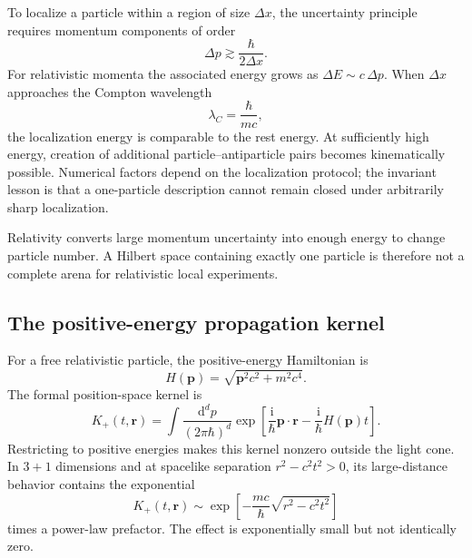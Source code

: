 \documentclass[11pt]{article}
\newcommand{\dd}{\mathrm{d}}
\newcommand{\ii}{\mathrm{i}}
\begin{document}
To localize a particle within a region of size $\Delta x$, the uncertainty
principle requires momentum components of order
\begin{equation}
  \Delta p\gtrsim\frac{\hbar}{2\Delta x}.
\end{equation}
For relativistic momenta the associated energy grows as
$\Delta E\sim c\,\Delta p$.  When $\Delta x$ approaches the Compton
wavelength
\begin{equation}
  \lambda_C=\frac{\hbar}{mc},
\end{equation}
the localization energy is comparable to the rest energy.  At sufficiently
high energy, creation of additional particle--antiparticle pairs becomes
kinematically possible.  Numerical factors depend on the localization
protocol; the invariant lesson is that a one-particle description cannot
remain closed under arbitrarily sharp localization.

\begin{keyidea}
Relativity converts large momentum uncertainty into enough energy to change
particle number.  A Hilbert space containing exactly one particle is
therefore not a complete arena for relativistic local experiments.
\end{keyidea}

\subsection{The positive-energy propagation kernel}

For a free relativistic particle, the positive-energy Hamiltonian is
\begin{equation}
  H(\bm p)=\sqrt{\bm p^2c^2+m^2c^4}.
\end{equation}
The formal position-space kernel is
\begin{equation}
  K_+(t,\bm r)
  =\int\frac{\dd^d p}{(2\pi\hbar)^d}
  \exp\left[
    \frac{\ii}{\hbar}\bm p\cdot\bm r
    -\frac{\ii}{\hbar}H(\bm p)t
  \right].
  \label{eq:positivekernel}
\end{equation}
Restricting to positive energies makes this kernel nonzero outside the light
cone.  In $3+1$ dimensions and at spacelike separation
$r^2-c^2t^2>0$, its large-distance behavior contains the exponential
\begin{equation}
  K_+(t,\bm r)
  \sim
  \exp\left[
    -\frac{mc}{\hbar}\sqrt{r^2-c^2t^2}
  \right]
\end{equation}
times a power-law prefactor.  The effect is exponentially small but not
identically zero.
\end{document}
